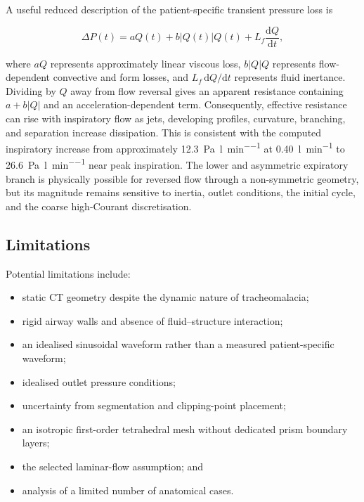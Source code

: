 \documentclass[11pt,a4paper]{article}
\begin{document}
A useful reduced description of the patient-specific transient pressure loss is

\begin{equation}
  \Delta P(t)=aQ(t)+b|Q(t)|Q(t)+L_f\frac{\mathrm{d}Q}{\mathrm{d}t},
  \label{eq:nonlinear_pressure_loss}
\end{equation}

where $aQ$ represents approximately linear viscous loss, $b|Q|Q$ represents
flow-dependent convective and form losses, and $L_f\,\mathrm{d}Q/\mathrm{d}t$
represents fluid inertance. Dividing by $Q$ away from flow reversal gives an
apparent resistance containing $a+b|Q|$ and an acceleration-dependent term.
Consequently, effective resistance can rise with inspiratory flow as jets,
developing profiles, curvature, branching, and separation increase dissipation.
This is consistent with the computed inspiratory increase from approximately
\SI{12.3}{\pascal\per\litre\per\minute} at \SI{0.40}{\litre\per\minute} to
\SI{26.6}{\pascal\per\litre\per\minute} near peak inspiration. The lower and
asymmetric expiratory branch is physically possible for reversed flow through a
non-symmetric geometry, but its magnitude remains sensitive to inertia, outlet
conditions, the initial cycle, and the coarse high-Courant discretisation.

\subsection{Limitations}

Potential limitations include:

\begin{itemize}
  \item static CT geometry despite the dynamic nature of tracheomalacia;
  \item rigid airway walls and absence of fluid--structure interaction;
  \item an idealised sinusoidal waveform rather than a measured patient-specific waveform;
  \item idealised outlet pressure conditions;
  \item uncertainty from segmentation and clipping-point placement;
  \item an isotropic first-order tetrahedral mesh without dedicated prism
        boundary layers;
  \item the selected laminar-flow assumption; and
  \item analysis of a limited number of anatomical cases.
\end{itemize}
\end{document}
